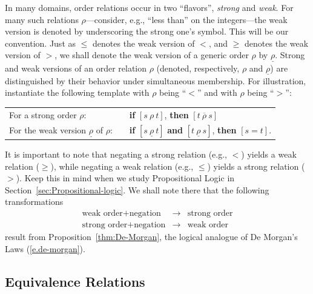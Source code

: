 
In many domains, order relations occur in two ``flavors'', {\em
  strong} and {\em weak}. For
many such relations $\rho$---consider, e.g., ``less than'' on the
integers---the weak version is denoted by underscoring the strong
one's symbol.  This will be our convention.  Just as $\leq$ denotes
the weak version of $<$, and $\geq$ denotes the weak version of $>$,
we shall denote the weak version of a generic order $\rho$ by
$\underline{\rho}$.
Strong and weak versions of an order relation $\rho$ (denoted,
respectively, $\rho$ and $\underline{\rho}$) are distinguished by
their behavior under simultaneous membership.  For illustration,
instantiate the following template with $\rho$ being ``$<$'' and with
$\rho$ being ``$>$'':

\smallskip

\begin{tabular}{lll}
For a strong order $\rho$: & &
{\bf if} $[s \ \rho \ t]$, {\bf then} $[t \ \overline{\rho} \ s]$ \\
For the weak version $\underline{\rho}$ of $\rho$: & &
{\bf if} $[s \ \underline{\rho} \ t]$ {\bf and} $[t \ \underline{\rho}
  \ s]$, {\bf then} $[s = t]$.
\end{tabular}

\medskip

It is important to note that negating a strong relation (e.g., $<$)
yields a weak relation ($\geq$), while negating a weak relation (e.g.,
$\leq$) yields a strong relation ($>$).  Keep this in mind when we
study Propositional Logic in Section~\ref{sec:Propositional-logic}.
We shall note there that the following transformations
\begin{eqnarray*}
\mbox{weak order} + \mbox{negation} 
 & \longrightarrow & \mbox{strong order} \\
\mbox{strong order} + \mbox{negation}
 & \longrightarrow & \mbox{weak order}
\end{eqnarray*}
result from Proposition~\ref{thm:De-Morgan}, the logical analogue of
De Morgan's Laws (\ref{e.de-morgan}).

\subsection{Equivalence Relations}
\label{sec:equiv-relation}

